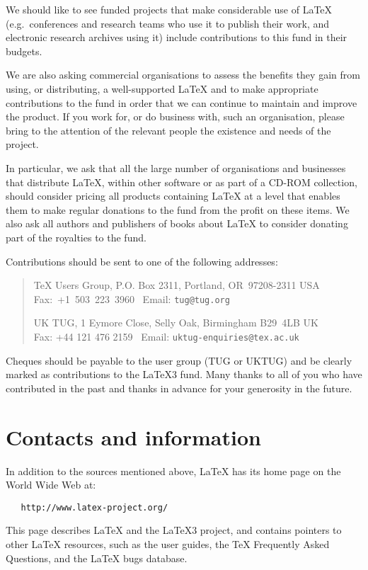 \documentclass[a4paper]{article}
\newcommand{\eg}{e.g.~}
\begin{document}
We should like to see funded projects that make considerable use of
\LaTeX{} (\eg conferences and research teams who use it to publish
their work, and electronic research archives using it) include
contributions to this fund in their budgets.  %

We are also asking commercial organisations to assess the benefits
they gain from using, or distributing, a well-supported \LaTeX{} and
to make appropriate contributions to the fund in order that we can
continue to maintain and improve the product.  If you work for, or do
business with, such an organisation, please bring to the attention of
the relevant people the existence and needs of the project.

In particular, we ask that all the large number of organisations and
businesses that distribute \LaTeX{}, within other software or as part
of a CD-ROM collection, should consider pricing all products containing
\LaTeX{} at a level that enables them to make regular donations to the
fund from the profit on these items.  We also ask all authors and
publishers of books about \LaTeX{} to consider donating part of the
royalties to the fund.

Contributions should be sent to one of the following addresses:
\begin{quote}\small\label{addrs}
   \TeX{} Users Group, P.O. Box 2311, Portland, OR~97208-2311 USA\\
   Fax:~+1~503~223~3960 \ Email: \texttt{tug@tug.org}

 \noindent
   UK TUG, 1 Eymore Close, Selly Oak, Birmingham B29~4LB UK\\
   Fax: +44 121 476 2159 \ Email: \texttt{uktug-enquiries@tex.ac.uk}
\end{quote}

Cheques should be payable to the user group (TUG or UKTUG) and be
clearly marked as contributions to the \LaTeX3 fund.
Many thanks to all of you who have contributed in the past and thanks
in advance for your generosity in the future.

\section{Contacts and information}
\label{contacts}

In addition to the sources mentioned above, \LaTeX{} has its home page
on the World Wide Web at:
\begin{verbatim}
   http://www.latex-project.org/
\end{verbatim}
This page describes \LaTeX{} and the \LaTeX3 project, and contains
pointers to other \LaTeX{} resources, such as the user guides, the
\TeX{} Frequently Asked Questions, and the \LaTeX{} bugs database.
\end{document}
